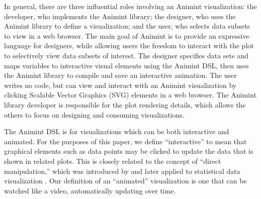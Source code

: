 \documentclass[10pt,journal,compsoc]{IEEEtran}\usepackage[]{graphicx}\usepackage[]{color}
\begin{document}

In general, there are three influential roles involving an Animint
visualization: the developer, who implements the Animint library; the
designer, who uses the Animint library to define a visualization; and
the user, who selects data subsets to view in a web browser. The main
goal of Animint is to provide an expressive language for designers,
while allowing users the freedom to interact with the plot to
selectively view data subsets of interest. The designer specifies data
sets and maps variables to interactive visual elements using the
Animint DSL, then uses the Animint library to compile and save an
interactive animation. The user writes no code, but can view and
interact with an Animint visualization by clicking Scalable Vector
Graphics (SVG) elements in a web browser. The Animint library
developer is responsible for the plot rendering details, which allows
the others to focus on designing and consuming visualizations.


The Animint DSL is for visualizations which can be both interactive
and animated. For the purposes of this paper, we define
``interactive'' to mean that graphical elements such as data points
may be clicked to update the data that is shown in related plots. This
is closely related to the concept of ``direct manipulation,'' which
was introduced by \citet{shneiderman82} and later applied to
statistical data visualization \citep{Hutchins:1985,
  brushing-scatterplots, cleveland}. Our definition of an ``animated''
visualization is one that can be watched like a video, automatically
updating over time.

\end{document}
